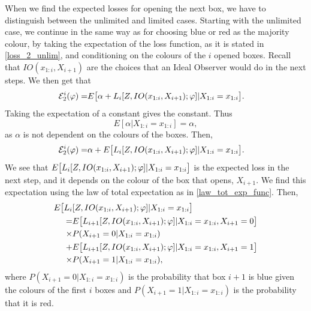 When we find the expected losses for opening the next box, we have to distinguish between the unlimited and limited cases. Starting with the unlimited case, we continue in the same way as for choosing blue or red as the majority colour, by taking the expectation of the loss function, as it is stated in \eqref{loss_2_unlim}, and conditioning on the colours of the $i$ opened boxes. Recall that $IO(x_{1:i},X_{i+1})$ are the choices that an Ideal Observer would do in the next steps. We then get that
\begin{equation*}
    \begin{aligned}
        \mathcal{E}^i_{2}(\varphi) 
        =& E \big[ \alpha + L_i[Z,IO(x_{1:i},X_{i+1});\varphi] |X_{1:i}=x_{1:i}\big].
    \end{aligned}
\end{equation*}
Taking the expectation of a constant gives the constant. Thus
\begin{equation*}
    E[\alpha|X_{1:i}=x_{1:i}]=\alpha,
\end{equation*}
as $\alpha$ is not dependent on the colours of the boxes. Then,
\begin{equation}
\label{exp_loss_unlim_2_unfinished}
    \begin{aligned}
        \mathcal{E}^i_{2}(\varphi) 
        =& \alpha + E \big[L_i[Z,IO(x_{1:i},X_{i+1});\varphi] |X_{1:i}=x_{1:i}\big].
    \end{aligned}
\end{equation}
We see that $E \big[L_i[Z,IO(x_{1:i},X_{i+1});\varphi] |X_{1:i}=x_{1:i}\big]$ is the expected loss in the next step, and it depends on the colour of the box that opens, $X_{i+1}$. We find this expectation using the law of total expectation as in \eqref{law_tot_exp_func}. Then,
\begin{equation}
\label{exp_loss_next_unlim}
    \begin{aligned}
        E \big[L_i&[Z,IO(x_{1:i},X_{i+1});\varphi] |X_{1:i}=x_{1:i}\big] \\
        =& E \big[L_{i+1}[Z,IO(x_{1:i},X_{i+1});\varphi] |X_{1:i}=x_{1:i},X_{i+1}=0\big]\\
        \times& P(X_{i+1}=0|X_{1:i}=x_{1:i}) \\
        +& E \big[L_{i+1}[Z,IO(x_{1:i},X_{i+1});\varphi] |X_{1:i}=x_{1:i},X_{i+1}=1\big]\\
        \times & P(X_{i+1}=1|X_{1:i}=x_{1:i}),
    \end{aligned}
\end{equation}
where $P(X_{i+1}=0|X_{1:i}=x_{1:i})$ is the probability that box $i+1$ is blue given the colours of the first $i$ boxes and $P(X_{i+1}=1|X_{1:i}=x_{1:i})$ is the probability that it is red.  


